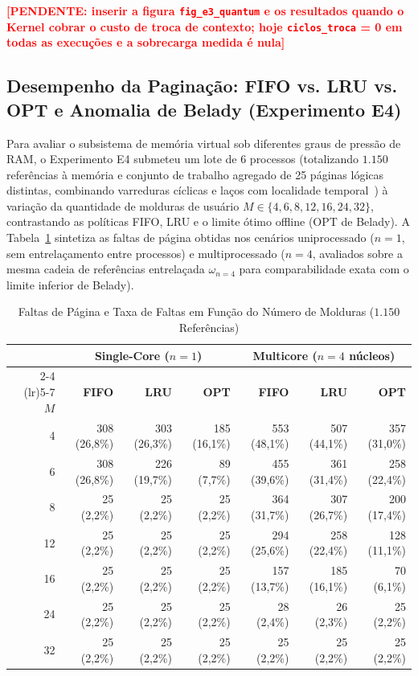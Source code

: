 \documentclass[conference]{IEEEtran}
\newcommand{\pendente}[1]{\textcolor{red}{\textbf{[PENDENTE: #1]}}}
\begin{document}
\pendente{inserir a figura \texttt{fig\_e3\_quantum} e os resultados quando o Kernel cobrar o custo de troca de contexto; hoje \texttt{ciclos\_troca} = 0 em todas as execuções e a sobrecarga medida é nula}

\subsection{Desempenho da Paginação: FIFO vs. LRU vs. OPT e Anomalia de Belady (Experimento E4)}
Para avaliar o subsistema de memória virtual sob diferentes graus de pressão de RAM, o Experimento E4 submeteu um lote de 6 processos (totalizando $1.150$ referências à memória e conjunto de trabalho agregado de 25 páginas lógicas distintas, combinando varreduras cíclicas e laços com localidade temporal~\cite{denning1968}) à variação da quantidade de molduras de usuário $M \in \{4, 6, 8, 12, 16, 24, 32\}$, contrastando as políticas FIFO, LRU e o limite ótimo offline (OPT de Belady). A Tabela~\ref{tab:resultados_e4} sintetiza as faltas de página obtidas nos cenários uniprocessado ($n = 1$, sem entrelaçamento entre processos) e multiprocessado ($n = 4$, avaliados sobre a mesma cadeia de referências entrelaçada $\omega_{n=4}$ para comparabilidade exata com o limite inferior de Belady).

\begin{table}[htbp]
\caption{Faltas de Página e Taxa de Faltas em Função do Número de Molduras ($1.150$ Referências)}
\label{tab:resultados_e4}
\centering
\footnotesize
\begin{tabular}{@{}rrrrrrr@{}}
\toprule
 & \multicolumn{3}{c}{\textbf{Single-Core ($n=1$)}} & \multicolumn{3}{c}{\textbf{Multicore ($n=4$ núcleos)}} \\
\cmidrule(lr){2-4} \cmidrule(lr){5-7}
\textbf{$M$} & \textbf{FIFO} & \textbf{LRU} & \textbf{OPT} & \textbf{FIFO} & \textbf{LRU} & \textbf{OPT} \\
\midrule
4  & 308 (26,8\%) & 303 (26,3\%) & 185 (16,1\%) & 553 (48,1\%) & 507 (44,1\%) & 357 (31,0\%) \\
6  & 308 (26,8\%) & 226 (19,7\%) &  89 (7,7\%)  & 455 (39,6\%) & 361 (31,4\%) & 258 (22,4\%) \\
8  &  25 (2,2\%)  &  25 (2,2\%)  &  25 (2,2\%)  & 364 (31,7\%) & 307 (26,7\%) & 200 (17,4\%) \\
12 &  25 (2,2\%)  &  25 (2,2\%)  &  25 (2,2\%)  & 294 (25,6\%) & 258 (22,4\%) & 128 (11,1\%) \\
16 &  25 (2,2\%)  &  25 (2,2\%)  &  25 (2,2\%)  & 157 (13,7\%) & 185 (16,1\%) &  70 (6,1\%)  \\
24 &  25 (2,2\%)  &  25 (2,2\%)  &  25 (2,2\%)  &  28 (2,4\%)  &  26 (2,3\%)  &  25 (2,2\%)  \\
32 &  25 (2,2\%)  &  25 (2,2\%)  &  25 (2,2\%)  &  25 (2,2\%)  &  25 (2,2\%)  &  25 (2,2\%)  \\
\bottomrule
\end{tabular}
\end{table}
\end{document}

